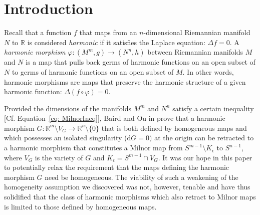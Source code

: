 \documentclass[12pt]{article}
\newcommand{\diff}{\text{d}}
\theoremstyle{definition}
\numberwithin{equation}{subsection}
\begin{document}
\tableofcontents
\listoffigures
\section{Introduction}
Recall that a function $f$ that maps from an $n$-dimensional Riemannian manifold $N$ to $\mathbb{R}$ is considered \textit{harmonic} if it satisfies the Laplace equation: $\Delta f = 0$. A \textit{harmonic morphism} $\varphi: (M^m, g) \rightarrow (N^n, h)$ between Riemannian manifolds $M$ and $N$ is a map that pulls back germs of harmonic functions on an open subset of $N$ to germs of harmonic functions on an open subset of $M$. In other words, harmonic morphisms are maps that preserve the harmonic structure of a given harmonic function: $\Delta (f \circ \varphi ) = 0$.

\indent Provided the dimensions of the manifolds $M^m$ and $N^n$ satisfy a certain inequality [Cf.  Equation~\ref{eq: MilnorIneq}], Baird and Ou in \cite{BairdOu} prove that a harmonic morphism $G: \mathbb{R}^m \setminus V_G \rightarrow\mathbb{R}^n \setminus \{0 \} $ that is both defined by homogeneous maps and which possesses an isolated singularity ($\diff G = 0)$ at the origin can be retracted to a harmonic morphism that constitutes a Milnor map from $S^{m-1} \setminus K_\epsilon$ to $S^{n-1}$, where $V_G$ is the variety of $G$ and $K_\epsilon = S^{m-1} \cap V_G$. It was our hope in this paper to potentially relax the requirement that the maps defining the harmonic morphism $G$ need be homogeneous. The viability of such a weakening of the homogeneity assumption we discovered was not, however, tenable and have thus solidified that the class of harmonic morphisms which also retract to Milnor maps is limited to those defined by homogeneous maps.\\
\end{document}

